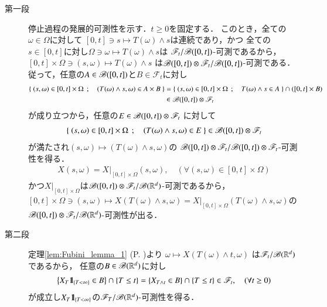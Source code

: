 	\begin{prf}\mbox{}
		\begin{description}
			\item[第一段]
				停止過程の発展的可測性を示す．$t \geq 0$を固定する．
				このとき，全ての$\omega \in \Omega$に対して
				$[0,t] \ni s \longmapsto T(\omega) \wedge s$は連続であり，かつ
				全ての$s \in [0,t]$に対し$\Omega \ni \omega \longmapsto T(\omega) \wedge s$は
				$\mathscr{F}_t/\mathscr{B}([0,t])$-可測であるから，
				$[0,t] \times \Omega \ni (s,\omega) \longmapsto T(\omega) \wedge s$
				は$\mathscr{B}([0,t]) \otimes \mathscr{F}_t/\mathscr{B}([0,t])$-可測である．
				従って，任意の$A \in \mathscr{B}([0,t])$と$B \in \mathscr{F}_t$に対し
				\begin{align}
					\left\{\ (s,\omega) \in [0,t] \times \Omega\ \, ; \quad (T(\omega) \wedge s,\omega) \in A \times B\ \right\}
					&= \left\{\ (s,\omega) \in [0,t] \times \Omega\ \, ; \quad T(\omega) \wedge s \in A\ \right\}
					\cap ([0,t] \times B) \\
					&\in \mathscr{B}([0,t]) \otimes \mathscr{F}_t
				\end{align}
				が成り立つから，任意の$E \in \mathscr{B}([0,t]) \otimes \mathscr{F}_t$
				に対して
				\begin{align}
					\left\{\ (s,\omega) \in [0,t] \times \Omega\ \, ; \quad (T(\omega) \wedge s,\omega) \in E\ \right\} 
					\in \mathscr{B}([0,t]) \otimes \mathscr{F}_t
				\end{align}
				が満たされ$(s,\omega) \longmapsto (T(\omega) \wedge s,\omega)$の
				$\mathscr{B}([0,t]) \otimes \mathscr{F}_t/\mathscr{B}([0,t]) \otimes \mathscr{F}_t$-可測性を得る．
				\begin{align}
					X(s,\omega) = X|_{[0,t] \times \Omega}(s,\omega),
					\quad (\forall (s,\omega) \in [0,t] \times \Omega)
				\end{align}
				かつ$X|_{[0,t] \times \Omega}$は$\mathscr{B}([0,t]) \otimes \mathscr{F}_t/\mathscr{B}(\mathbb{R}^d)$-可測であるから，
				$[0,t] \times \Omega \ni (s,\omega) \longmapsto X(T(\omega) \wedge s,\omega) 
				= X|_{[0,t] \times \Omega}(T(\omega) \wedge s,\omega)$の
				$\mathscr{B}([0,t]) \otimes \mathscr{F}_t/\mathscr{B}(\mathbb{R}^d)$-可測性が出る．
				
			\item[第二段]
				定理\ref{lem:Fubini_lemma_1} (P. \pageref{lem:Fubini_lemma_1})より
				$\omega \longmapsto X(T(\omega) \wedge t,\omega)$
				は$\mathscr{F}_t/\mathscr{B}(\mathbb{R}^d)$であるから，
				任意の$B \in \mathscr{B}(\mathbb{R}^d)$に対し
				\begin{align}
					\left\{ X_T \mbox{1}\hspace{-0.25em}\mbox{l}_{\{T < \infty\}} \in B \right\} \cap \{T \leq t\}
					= \left\{ X_{T \wedge t} \in B \right\} \cap \{T \leq t\}
					\in \mathscr{F}_t,
					\quad (\forall t \geq 0)
				\end{align}
				が成立し$X_T \mbox{1}\hspace{-0.25em}\mbox{l}_{\{T < \infty\}}$の$\mathscr{F}_T/\mathscr{B}(\mathbb{R}^d)$-可測性を得る．
				\QED
		\end{description}
	\end{prf}
	
